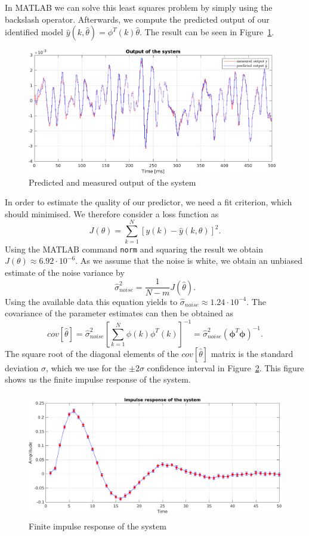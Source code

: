 \documentclass{scrartcl}
\begin{document}
In MATLAB we can solve this least squares problem by simply using the backslash operator. 
Afterwards, we compute the predicted output of our identified model $\hat{y} (k,\hat{\theta}) = \phi^{T} (k) \hat{\theta}$. The result can be seen in Figure~\ref{fig:output_fir}.
\begin{figure}[h]
	\centering
	\includegraphics[height=5.5cm]{figures/output.pdf}
	\caption{Predicted and measured output of the system}\label{fig:output_fir}
\end{figure}
In order to estimate the quality of our predictor, we need a fit criterion, which should minimised. We therefore consider a loss function as 
\begin{equation}\label{eq:J}
	J(\theta) = \sum\limits_{k=1}^N \left[y(k) - \hat{y}(k,\theta) \right]^2.
\end{equation}
Using the MATLAB command \texttt{norm} and squaring the result we obtain $ J(\theta) \approx 6.92 \cdot 10^{-6}$. 
As we assume that the noise is white, we obtain an unbiased estimate of the noise variance by
\begin{equation}\label{eq:sigma}
	\hat{\sigma}_{noise}^{2} = \frac{1}{N-m} J(\hat{\theta}) .
\end{equation}
Using the available data this equation yields to $ \hat{\sigma}_{noise} \approx 1.24 \cdot 10^{-4} $.
The covariance of the parameter estimates can then be obtained as
\begin{equation}\label{eq:cov}
	cov[\hat{\theta}] = \hat{\sigma}_{noise}^2 \left[ \sum\limits_{k=1}^N \phi(k)\phi^T(k) \right]^{-1} = \hat{\sigma}_{noise}^2 \left( \pmb{\phi}^T \pmb{\phi} \right)^{-1} .
\end{equation}
The square root of the diagonal elements of the $cov[\hat{\theta}]$ matrix is the standard deviation $ \sigma $, which we use for the $ \pm 2 \sigma $ confidence interval in Figure~\ref{fig:fir_response}. This figure shows us the finite impulse response of the system.
\begin{figure}[h]
	\centering
	\includegraphics[height=5.5cm]{figures/fir_response.pdf}
	\caption{Finite impulse response of the system}\label{fig:fir_response}
\end{figure}
\end{document}
